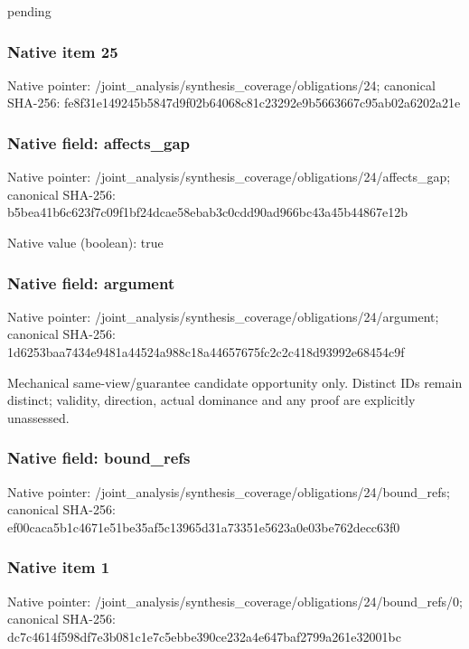 \documentclass[10pt,a4paper]{article}
\begin{document}
\begingroup\raggedright\sloppy pending\par\endgroup

\subsubsection{Native item 25}
Native pointer: /joint\_\allowbreak{}analysis/synthesis\_\allowbreak{}coverage/obligations/24; canonical SHA-256: fe8f31e149245b5847d9f02b64068c81c23292e9b5663667c95ab02a6202a21e

\subsubsection{Native field: affects\_\allowbreak{}gap}
Native pointer: /joint\_\allowbreak{}analysis/synthesis\_\allowbreak{}coverage/obligations/24/affects\_\allowbreak{}gap; canonical SHA-256: b5bea41b6c623f7c09f1bf24dcae58ebab3c0cdd90ad966bc43a45b44867e12b

Native value (boolean): true

\subsubsection{Native field: argument}
Native pointer: /joint\_\allowbreak{}analysis/synthesis\_\allowbreak{}coverage/obligations/24/argument; canonical SHA-256: 1d6253baa7434e9481a44524a988c18a44657675fc2c2c418d93992e68454c9f

\begingroup\raggedright\sloppy Mechanical same-view/\allowbreak{}guarantee candidate opportunity only. Distinct IDs remain distinct;\allowbreak{} validity,\allowbreak{} direction,\allowbreak{} actual dominance and any proof are explicitly unassessed.\par\endgroup

\subsubsection{Native field: bound\_\allowbreak{}refs}
Native pointer: /joint\_\allowbreak{}analysis/synthesis\_\allowbreak{}coverage/obligations/24/bound\_\allowbreak{}refs; canonical SHA-256: ef00caca5b1c4671e51be35af5c13965d31a73351e5623a0e03be762decc63f0

\subsubsection{Native item 1}
Native pointer: /joint\_\allowbreak{}analysis/synthesis\_\allowbreak{}coverage/obligations/24/bound\_\allowbreak{}refs/0; canonical SHA-256: dc7c4614f598df7e3b081c1e7c5ebbe390ce232a4e647baf2799a261e32001bc
\end{document}

